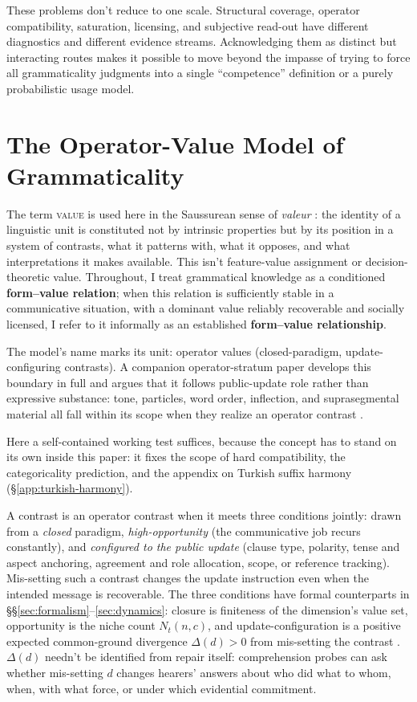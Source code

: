\documentclass[12pt,letterpaper]{article}
\newcommand{\term}[1]{\textsc{#1}}
\newcommand{\mention}[1]{\textit{#1}}
\begin{document}
\bigskip
These problems don't reduce to one scale. Structural coverage, operator compatibility, saturation, licensing, and subjective read-out have different diagnostics and different evidence streams. Acknowledging them as distinct but interacting routes makes it possible to move beyond the impasse of trying to force all grammaticality judgments into a single \enquote{competence} definition or a purely probabilistic usage model.

\section{The Operator-Value Model of Grammaticality}\label{sec:framework}
\label{sec:operator-values}

The term \term{value} is used here in the Saussurean sense of \mention{valeur} \autocite{saussure1916}: the identity of a linguistic unit is constituted not by intrinsic properties but by its position in a system of contrasts, what it patterns with, what it opposes, and what interpretations it makes available. This isn't feature-value assignment or decision-theoretic value. Throughout, I treat grammatical knowledge as a conditioned \textbf{form--value relation}; when this relation is sufficiently stable in a communicative situation, with a dominant value reliably recoverable and socially licensed, I refer to it informally as an established \textbf{form--value relationship}.

The model's name marks its unit: operator values (closed-paradigm, update-configuring contrasts). A companion operator-stratum paper develops this boundary in full and argues that it follows public-update role rather than expressive substance: tone, particles, word order, inflection, and suprasegmental material all fall within its scope when they realize an operator contrast \autocite{reynolds2026operators}.

Here a self-contained working test suffices, because the concept has to stand on its own inside this paper: it fixes the scope of hard compatibility, the categoricality prediction, and the appendix on Turkish suffix harmony (\S\ref{app:turkish-harmony}).

A contrast is an operator contrast when it meets three conditions jointly: drawn from a \emph{closed} paradigm, \emph{high-opportunity} (the communicative job recurs constantly), and \emph{configured to the public update} (clause type, polarity, tense and aspect anchoring, agreement and role allocation, scope, or reference tracking). Mis-setting such a contrast changes the update instruction even when the intended message is recoverable. The three conditions have formal counterparts in \S\S\ref{sec:formalism}--\ref{sec:dynamics}: closure is finiteness of the dimension's value set, opportunity is the niche count $N_t(n,c)$, and update-configuration is a positive expected common-ground divergence $\Delta(d)>0$ from mis-setting the contrast \autocite{reynolds2026operators}. $\Delta(d)$ needn't be identified from repair itself: comprehension probes can ask whether mis-setting $d$ changes hearers' answers about who did what to whom, when, with what force, or under which evidential commitment.
\end{document}
